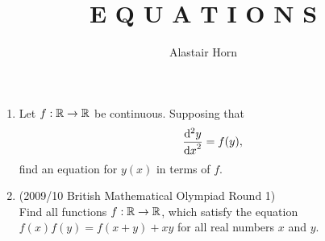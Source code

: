 \documentclass[a4paper,12pt]{article}
\author{Alastair Horn}
\title{E Q U A T I O N S}
\begin{document}
\maketitle

\begin{enumerate}
 \item
  Let \(f: \mathbb R \to \mathbb R\) be continuous. Supposing that
  \begin{equation*}
   \dv[2]<y>{x} = f(y),
  \end{equation*}
  find an equation for \(y(x)\) in terms of \(f\).
 \item (2009/10 British Mathematical Olympiad Round 1) \\
  Find all functions \(f: \mathbb R \to \mathbb R\), which satisfy the equation
  \(f(x)f(y) = f(x + y) + xy\) for all real numbers \(x\) and \(y\).
\end{enumerate}
\end{document}
